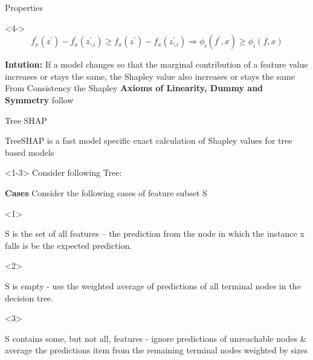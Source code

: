 \documentclass[11pt,compress,t,notes=noshow, aspectratio=169, xcolor=table]{beamer}
\begin{document}
\begin{vbframe}{Properties}
\begin{onlyenv}<4->
$$
f_{x}^{\prime}\left(z^{\prime}\right)-f_{x}^{\prime}\left(z^{\prime}_{\backslash i}\right) \geq f_{x}\left(z^{\prime}\right)-f_{x}\left(z^{\prime} _{\backslash i}\right) \Longrightarrow \phi_{i}\left(f^{\prime}, x\right) \geq \phi_{i}(f, x)
$$

\textbf{Intution:} If a model changes so that the marginal contribution of a feature value increases or stays the same, the Shapley value also increases or stays the same\\ 
From Consistency the Shapley \textbf{Axioms of Linearity, Dummy and Symmetry} follow
\end{onlyenv}


\end{vbframe}

\begin{vbframe}{Tree SHAP }

TreeSHAP is a fast model specific exact calculation of Shapley values for tree based models 

\begin{onlyenv}<1-3>
\vspace{0.5cm}
Consider following Tree:

\textbf{Cases}
Consider the following cases of feature subset S

\begin{itemize}
    \begin{onlyenv}<1>
    \item  S is the set of all features – 
    the prediction from the node in which the instance x falls is be the expected prediction.
    \end{onlyenv}
    \begin{onlyenv}<2>
    \item S is empty -
    use the weighted average of predictions of all terminal nodes in the decision tree. \\
     
    \end{onlyenv}
    \begin{onlyenv}<3>
    \item S contains some, but not all, features -
    ignore predictions of unreachable nodes \& average the predictions item from the remaining terminal nodes weighted by  sizes
    \end{onlyenv}
\end{itemize}


\end{onlyenv}
\end{vbframe}
\end{document}
